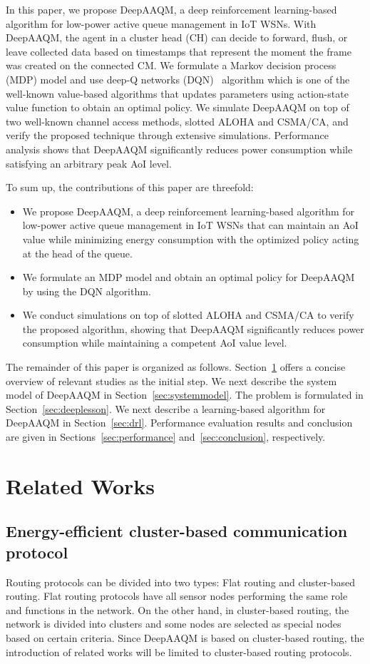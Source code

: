 \documentclass[journal]{IEEEtran}
\begin{document}
In this paper, we propose DeepAAQM, a deep reinforcement learning-based algorithm for low-power active queue management in IoT WSNs. With DeepAAQM, the agent in a cluster head (CH) can decide to forward, flush, or leave collected data based on timestamps that represent the moment the frame was created on the connected CM. We formulate a Markov decision process (MDP) model and use deep-Q networks (DQN)~\cite{mnih2013playing} algorithm which is one of the well-known value-based algorithms that updates parameters using action-state value function to obtain an optimal policy. We simulate DeepAAQM on top of two well-known channel access methods, slotted ALOHA and CSMA/CA, and verify the proposed technique through extensive simulations. Performance analysis shows that DeepAAQM significantly reduces power consumption while satisfying an arbitrary peak AoI level.

To sum up, the contributions of this paper are threefold: 
\begin{itemize}
    \item We propose DeepAAQM, a deep reinforcement learning-based algorithm for low-power active queue management in IoT WSNs that can maintain an AoI value while minimizing energy consumption with the optimized policy acting at the head of the queue.
    \item We formulate an MDP model and obtain an optimal policy for DeepAAQM by using the DQN algorithm.
    \item We conduct simulations on top of slotted ALOHA and CSMA/CA to verify the proposed algorithm, showing that DeepAAQM significantly reduces power consumption while maintaining a competent AoI value level.
\end{itemize}

The remainder of this paper is organized as follows. Section~\ref{sec:related} offers a concise overview of relevant studies as the initial step. We next describe the system model of DeepAAQM in Section~\ref{sec:systemmodel}. The problem is formulated in Section~\ref{sec:deeplesson}. We next describe a learning-based algorithm for DeepAAQM in Section~\ref{sec:drl}. Performance evaluation results and conclusion are given in Sections~\ref{sec:performance} and~\ref{sec:conclusion}, respectively.

\section{Related Works}
\label{sec:related}


\subsection{Energy-efficient cluster-based communication protocol}
\label{subsec:protocol}
Routing protocols can be divided into two types: Flat routing and cluster-based routing. Flat routing protocols have all sensor nodes performing the same role and functions in the network. On the other hand, in cluster-based routing, the network is divided into clusters and some nodes are selected as special nodes based on certain criteria. Since DeepAAQM is based on cluster-based routing, the introduction of related works will be limited to cluster-based routing protocols.
\end{document}

